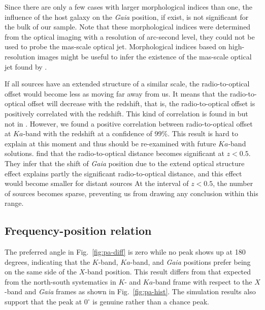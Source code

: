 \documentclass[referee]{aa}        %
\begin{document}
    Since there are only a few cases with larger morphological indices than one, the influence of the host galaxy on the \textit{Gaia} position, if exist, is not significant for the bulk of our sample.
    Note that these morphological indices were determined from the optical imaging with a resolution of arc-second level, they could not be used to probe the mas-scale optical jet.
    Morphological indices based on high-resolution images might be useful to infer the existence of the mas-scale optical jet found by \citet{2017MNRAS.467L..71P}.

    If all sources have an extended structure of a similar scale, the radio-to-optical offset would become less as moving far away from us.
    It means that the radio-to-optical offset will decrease with the redshift, that is, the radio-to-optical offset is positively correlated with the redshift.
    This kind of correlation is found in \citet{2014AJ....147...95Z} but not in \citet{2013A&A...553A..13O}.
    However, we found a positive correlation between radio-to-optical offset at $Ka$-band with the redshift at a confidence of 99\%.
    This result is hard to explain at this moment and thus should be re-examined with future $Ka$-band solutions.
    \citet{2017ApJ...835L..30M} find that the radio-to-optical distance becomes significant at $z<0.5$.
    They infer that the shift of \textit{Gaia} position due to the extend optical structure effect explains partly the significant radio-to-optical distance, and this effect would become smaller for distant sources
    At the interval of $z<0.5$, the number of sources becomes sparse, preventing us from drawing any conclusion within this range.


\subsection{Frequency-position relation} \label{subsec:freq-pos}

    The preferred angle in Fig.~\ref{fig:pa-diff} is zero while no peak shows up at 180 degrees, indicating that the $K$-band, $Ka$-band, and \textit{Gaia} positions prefer being on the same side of the $X$-band position.
    This result differs from that expected from the north-south systematics in $K$- and $Ka$-band frame with respect to the $X$-band and \textit{Gaia} frames as shown in Fig.~\ref{fig:pa-hist}.
    The simulation results also support that the peak at $0^{\circ}$ is genuine rather than a chance peak.
\end{document}
